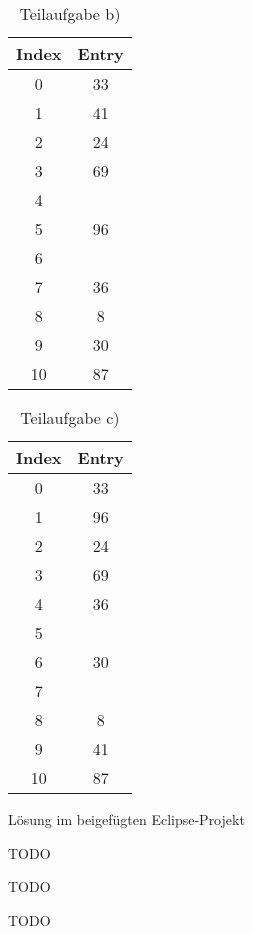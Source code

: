\documentclass[12pt]{scrartcl}
\begin{document}
\begin{table}[h!]
\begin{center}
\begin{tabular}{|c|c|}
\hline
Index & Entry\\
\hline
\hline
0 & 33\\
\hline
1 & 41\\
\hline
2 & 24 \\
\hline
3 & 69\\
\hline
4 & \\
\hline
5 & 96\\
\hline
6 & \\
\hline
7 & 36\\
\hline
8 & 8\\
\hline
9 & 30\\
\hline
10 & 87\\
\hline
\end{tabular}
\caption{Teilaufgabe b)}
\end{center}
\end{table}

\begin{table}[h!]
\begin{center}
\begin{tabular}{|c|c|}
\hline
Index & Entry\\
\hline
\hline
0 & 33\\
\hline
1 & 96\\
\hline
2 & 24 \\
\hline
3 & 69\\
\hline
4 & 36\\
\hline
5 & \\
\hline
6 & 30\\
\hline
7 & \\
\hline
8 & 8\\
\hline
9 & 41\\
\hline
10 & 87\\
\hline
\end{tabular}
\caption{Teilaufgabe c)}
\end{center}
\end{table}

\exercise{}
Lösung im beigefügten Eclipse-Projekt

\exercise{}
TODO

\exercise{}
TODO

\exercise{}
TODO



\end{document}
